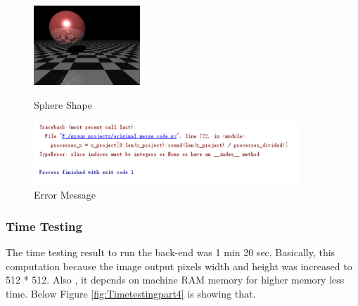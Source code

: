 \documentclass[a4paper, 12pt]{article}
\begin{document}
\begin{figure}[htbp]
\centering
\begin{minipage}[t]{0.38\textwidth}
\centering
\includegraphics[width=4cm]{ShD_Sphere_Pic.png}
\caption{Sphere Shape}
\label{fig:SphereShape}
\end{minipage}
\begin{minipage}[t]{0.48\textwidth}
\centering
\includegraphics[width=10cm]{ShD_error_message.png}
\caption{Error Message}
\label{fig:Error}
\end{minipage}
\end{figure}


\subsubsection{Time Testing}
The time testing result to run the back-end was 1 min 20 sec. Basically, this computation because the image output pixels width and height was increased to 512 * 512. Also , it depends on machine RAM memory for higher memory less time. Below Figure \ref{fig:Timetestingpart4} is showing that.
\end{document}
